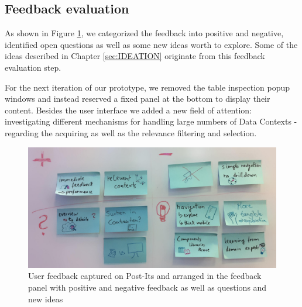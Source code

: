 \subsection{Feedback evaluation}
\label{subsec:FeedbackEvaluation}
As shown in Figure \ref{fig:user_feedback}, we categorized the feedback into positive and negative, identified open questions as well as some new ideas worth to explore. Some of the ideas described in Chapter \ref{sec:IDEATION} originate from this feedback evaluation step.

For the next iteration of our prototype, we removed the table inspection popup windows and instead reserved a fixed panel at the bottom to display their content. Besides the user interface we added a new field of attention: investigating different mechanisms for handling large numbers of Data Contexts - regarding the acquiring as well as the relevance filtering and selection.

\begin{figure}
\begin{centering}
    \includegraphics[width=1.0\linewidth]{images/user_feedback}
    \caption{User feedback captured on Post-Its and arranged in the feedback panel with positive and negative feedback as well as questions and new ideas}
    \label{fig:user_feedback}
\end{centering}
\end{figure}